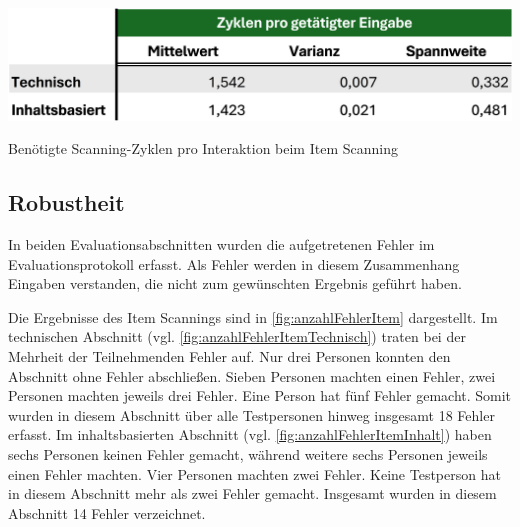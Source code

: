 
\begin{table}[tbh]
    \centering
    \includegraphics{images/Results/Zyklen-Item.png}
    \caption{Benötigte Scanning-Zyklen pro Interaktion beim Item Scanning}
    \label{tab:zyklen}
\end{table}

\subsection{Robustheit}

In beiden Evaluationsabschnitten wurden die aufgetretenen Fehler im Evaluationsprotokoll erfasst. Als Fehler werden in diesem Zusammenhang Eingaben verstanden, die nicht zum gewünschten Ergebnis geführt haben. 

Die Ergebnisse des Item Scannings sind in \autoref{fig:anzahlFehlerItem} dargestellt. Im technischen Abschnitt (vgl. \autoref{fig:anzahlFehlerItemTechnisch}) traten bei der Mehrheit der Teilnehmenden Fehler auf. Nur drei Personen konnten den Abschnitt ohne Fehler abschließen. Sieben Personen machten einen Fehler, zwei Personen machten jeweils drei Fehler. Eine Person hat fünf Fehler gemacht. Somit wurden in diesem Abschnitt über alle Testpersonen hinweg insgesamt 18 Fehler erfasst.
Im inhaltsbasierten Abschnitt (vgl. \autoref{fig:anzahlFehlerItemInhalt}) haben sechs Personen keinen Fehler gemacht, während weitere sechs Personen jeweils einen Fehler machten. Vier Personen machten zwei Fehler. Keine Testperson hat in diesem Abschnitt mehr als zwei Fehler gemacht. Insgesamt wurden in diesem Abschnitt 14 Fehler verzeichnet.

